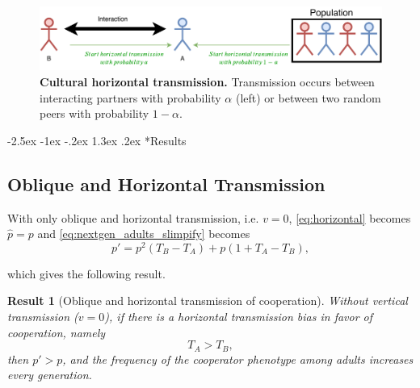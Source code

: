 \documentclass[12pt]{extarticle}
\makeatletter
\renewcommand\section{\@startsection {section}{1}{\z@}%
     {-2.5ex \@plus -1ex \@minus -.2ex}%
     {1.3ex \@plus.2ex}%
    {\Large\bfseries}}
\newtheorem{result}{Result}
\makeatother
\begin{document}
\begin{figure}[thb]
  \centering
  \includegraphics[scale=1]{figure1.pdf}
  \caption{\textbf{Cultural horizontal transmission.} Transmission occurs between interacting partners with probability $\alpha$ (left) or between two random peers with probability $1-\alpha$.}
  \label{fig:horizontal}
\end{figure}


\section*{Results}


\subsection*{Oblique and Horizontal Transmission}

With only oblique and horizontal transmission, i.e. $v = 0$, \autoref{eq:horizontal} becomes $\hat{p}=p$ and \autoref{eq:nextgen_adults_slimpify} becomes %
\begin{equation}  \label{eq:nextgen_parents_oblique_only}
p' = p^2 (T_B-T_A) + p (1+T_A-T_B) ,
\end{equation}

which gives the following result.\\

\begin{result}[Oblique and horizontal transmission of cooperation]
Without vertical transmission ($v=0$), if there is a horizontal transmission bias in favor of cooperation, namely
\begin{equation} \label{eq:oblique_only_result}
T_A > T_B, 
\end{equation}
then $p'>p$, and the frequency of the cooperator phenotype among adults increases every generation.
\end{result}
\end{document}
